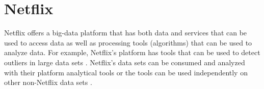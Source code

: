\section{Netflix}

Netflix offers a big-data platform that has both data and services that can be 
used to access data as well as processing tools (algorithms) that can be used to
analyze data.  For example, Netflix's platform has tools that can be used to
detect outliers in large data sets \cite{Wong2015}.  Netflix’s data
sets can be consumed and analyzed with their platform analytical tools or the
tools can be used independently on other non-Netflix data sets \cite{Netflix2018}.


